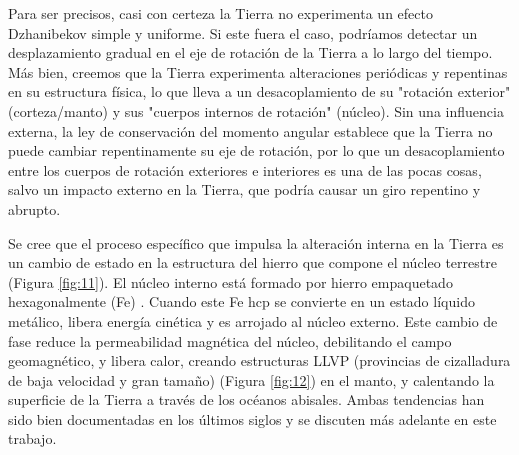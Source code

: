 \documentclass[10pt,twocolumn,letterpaper]{article}
\begin{document}
Para ser precisos, casi con certeza la Tierra no experimenta un efecto Dzhanibekov simple y uniforme. Si este fuera el caso, podríamos detectar un desplazamiento gradual en el eje de rotación de la Tierra a lo largo del tiempo. Más bien, creemos que la Tierra experimenta alteraciones periódicas y repentinas en su estructura física, lo que lleva a un desacoplamiento de su "rotación exterior" (corteza/manto) y sus "cuerpos internos de rotación" (núcleo). Sin una influencia externa, la ley de conservación del momento angular establece que la Tierra no puede cambiar repentinamente su eje de rotación, por lo que un desacoplamiento entre los cuerpos de rotación exteriores e interiores es una de las pocas cosas, salvo un impacto externo en la Tierra, que podría causar un giro repentino y abrupto.

Se cree que el proceso específico que impulsa la alteración interna en la Tierra es un cambio de estado en la estructura del hierro que compone el núcleo terrestre (Figura \ref{fig:11}). El núcleo interno está formado por hierro empaquetado hexagonalmente (Fe) \cite{141}. Cuando este Fe hcp se convierte en un estado líquido metálico, libera energía cinética y es arrojado al núcleo externo. Este cambio de fase reduce la permeabilidad magnética del núcleo, debilitando el campo geomagnético, y libera calor, creando estructuras LLVP (provincias de cizalladura de baja velocidad y gran tamaño) (Figura \ref{fig:12}) \cite{38} en el manto, y calentando la superficie de la Tierra a través de los océanos abisales. Ambas tendencias han sido bien documentadas en los últimos siglos y se discuten más adelante en este trabajo.
\end{document}
